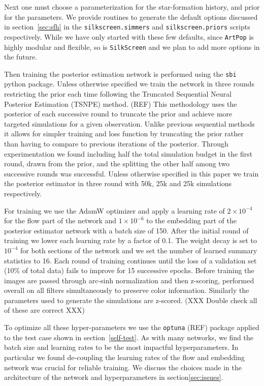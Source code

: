 \documentclass[twocolumn]{aastex631}
\newcommand{\code}[0]{\texttt{SilkScreen}}
\newcommand{\artpop}[0]{\texttt{ArtPop}}
\newcommand{\sbi}[0]{\texttt{sbi}}
\begin{document}
Next one must choose a parameterization for the star-formation history, and prior for the parameters. We provide routines to generate the default options discussed in section~\ref{sec:sfh} in the \texttt{silkscreen.simmers} and \texttt{silkscreen.priors} scripts respectively. While we have only started with these few defaults, since \artpop{} is highly modular and flexible, so is \code{} and we plan to add more options in the future.

Then training the posterior estimation network is performed using the \sbi{} python package. Unless otherwise specified we train the network in three rounds restricting the prior each time following the Truncated Sequential Neural Posterior Estimation (TSNPE) method. (REF) This methodology uses the posterior of each successive round to truncate the prior and achieve more targeted simulations for a given observation. Unlike previous sequential methods it allows for simpler training and loss function by truncating the prior rather than having to compare to previous iterations of the posterior. Through experimentation we found including half the total simulation budget in the first round, drawn from the prior, and the splitting the other half among two successive rounds was successful. Unless otherwise specified in this paper we train the posterior estimator in three round with 50k, 25k and 25k simulations respectively.

For training we use the AdamW optimizer and apply a learning rate of $2\times 10^{-4}$ for the flow part of the network and $1\times 10^{-6}$ to the embedding part of the posterior estimator network with a batch size of 150. After the initial round of training we lower each learning rate by a factor of 0.1. The weight decay is set to $10^{-4}$ for both sections of the network and we set the number of learned summary statistics to 16. Each round of training continues until the loss of a validation set (10\% of total data) fails to improve for 15 successive epochs. Before training the images are passed through arc-sinh normalization and then z-scoring, performed overall on all filters simultaneously to preserve color information. Similarly the parameters used to generate the simulations are z-scored. (XXX Double check all of these are correct XXX)

To optimize all these hyper-parameters we use the \texttt{optuna} (REF) package applied to the test case shown in section~\ref{self-test}. As with many networks, we find the batch size and learning rates to be the most impactful hyperparameters. In particular we found de-coupling the learning rates of the flow and embedding network was crucial for reliable training. We discuss the choices made in the architecture of the network and hyperparameters in section\ref{sec:issues}.
\end{document}
